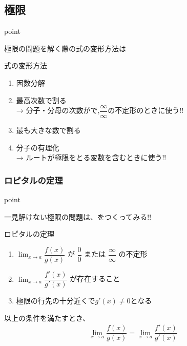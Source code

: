 \documentclass[a4paper]{jsarticle}
\begin{document}
\subsection{極限}
\begin{itembox}[l]{point}
    \begin{center}
        極限の問題を解く際の式の変形方法は
    \end{center}
\end{itembox}
\begin{itembox}[l]{式の変形方法}
    \begin{enumerate}[(1)]
        \item 因数分解
        \item 最高次数で割る\\
              → 分子・分母の次数がで,$\dfrac{\infty}{\infty}$の不定形のときに使う!!
        \item 最も大きな数で割る
        \item 分子の有理化\\
              → ルートが極限をとる変数を含むときに使う!!
    \end{enumerate}
\end{itembox}
\subsubsection{ロピタルの定理}
\begin{itembox}[l]{point}
    \begin{center}
        一見解けない極限の問題は、をつくってみる!!
    \end{center}
\end{itembox}
\begin{itembox}[l]{ロピタルの定理}
    \begin{enumerate}[(1)]
        \item $\displaystyle\lim_{x\rightarrow a}\dfrac{f\left(x\right)}{g\left(x\right)}$ が $\dfrac{0}{0}$ または $\dfrac{\infty}{\infty}$ の不定形\\
        \item $\displaystyle\lim_{x\rightarrow a}\dfrac{f'\left(x\right)}{g'\left(x\right)}$ が存在すること
        \item 極限の行先の十分近くで$g'\left(x\right)\neq 0$となる
    \end{enumerate}
    以上の条件を満たすとき、
    \begin{eqnarray*}
        \lim_{x\rightarrow a}\dfrac{f\left(x\right)}{g\left(x\right)}=\lim_{x\rightarrow a}\dfrac{f'\left(x\right)}{g'\left(x\right)}\\
    \end{eqnarray*}
\end{itembox}
\end{document}
